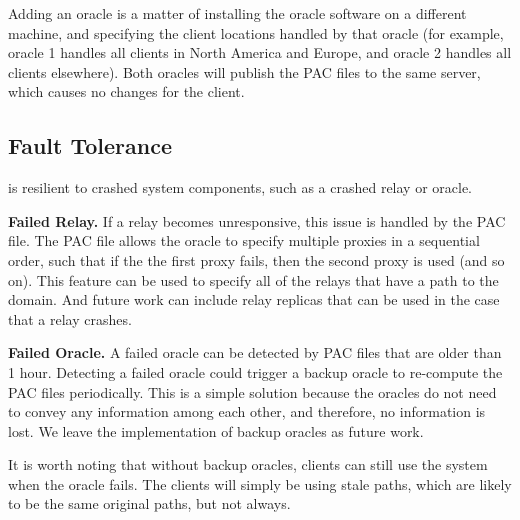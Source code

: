 Adding an oracle is a matter of installing the oracle software on 
a different machine, and specifying the client locations handled by that oracle 
(for example, oracle 1 handles all clients in North America and Europe, and 
oracle 2 handles all clients elsewhere).  Both oracles will publish the PAC files 
to the same server, which causes no changes for the client.

\subsection{Fault Tolerance}
\system{} is resilient to crashed system components, such as a crashed relay or 
oracle.  

{\bf Failed Relay.} If a relay becomes unresponsive, this issue is handled by 
the PAC file.  The PAC file allows the oracle to specify multiple proxies in 
a sequential order, such that if the the first proxy fails, then the second 
proxy is used (and so on).  This feature can be used to specify all of the 
relays that have a path to the domain.  And future work can include relay 
replicas that can be used in the case that a relay crashes.

{\bf Failed Oracle.} A failed oracle can be detected by PAC files that are 
older than 1 hour.  Detecting a failed oracle could trigger a backup oracle 
to re-compute the PAC files periodically.  This is a simple solution because 
the oracles do not need to convey any information among each other, and therefore, 
no information is lost.  We leave the implementation of backup oracles as future 
work.

It is worth noting that without backup oracles, clients can still use the system 
when the oracle fails.  The clients will simply be using stale paths, which are 
likely to be the same original paths, but not always.  


